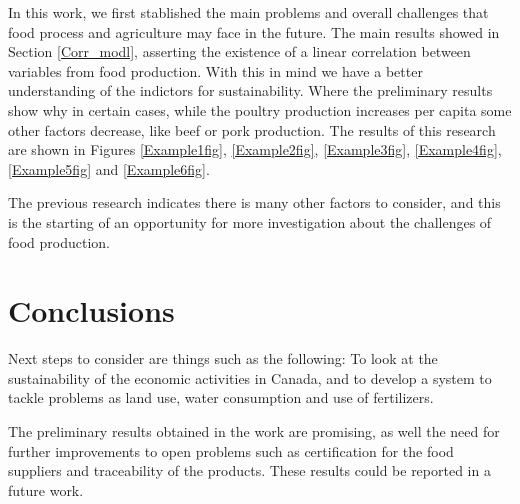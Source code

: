 \documentclass[11pt]{article}
\numberwithin{equation}{section}
\begin{document}
In this work, we first stablished the main problems and overall challenges that  food process and agriculture  may face in the future. The main results showed in Section  \ref{Corr_modl}, asserting the existence of a linear correlation between  variables from food production. With this in mind we have a better understanding of the indictors for sustainability. Where the preliminary results show why in certain cases, while the poultry production increases per capita some other factors decrease, like beef or pork production. The results of this research are shown in Figures \ref{Example1fig}, \ref{Example2fig}, \ref{Example3fig}, \ref{Example4fig}, \ref{Example5fig}  and \ref{Example6fig}.

The previous research indicates there is many other factors to consider, and this is the starting of an opportunity for more investigation about the challenges of food production. 


\section{Conclusions}

Next steps to consider are things such as the following: To look at the sustainability of the economic activities in Canada, and to develop a system to tackle problems as land use, water consumption and use of fertilizers. 

The preliminary results obtained in the work are promising, as well the need for further improvements to open  problems such as certification for the food suppliers and traceability of the products. These results could be reported in a future work.

\end{document}
